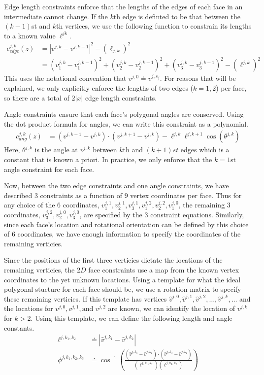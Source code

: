 Edge length constraints enforce that the lengths of the edges of each face in an intermediate cannot change. If the $k$th edge is definted to be that between the $(k-1)$st and $k$th vertices, we use the following function to constrain its lengths to a known value $\ell^{jk}$.
\begin{align}
c_{edge}^{j,k}\left(z\right)& = \left|v^{j,k} - v^{j,k-1}\right|^2 - (\ell_{j,k})^2 \\
& = \left(v_1^{j,k} - v_1^{j,k-1}\right)^2 +\left(v_2^{j,k} - v_2^{j,k-1}\right)^2 +\left(v_3^{j,k} - v_3^{j,k-1}\right)^2 - (\ell^{j,k})^2 
\end{align}  
This uses the notational convention that $v^{j,0} \doteq v^{j,s_j}$. For reasons that will be explained, we only explicitly enforce the lengths of two edges ($k=1,2$) per face, so there are a total of $2|x|$ edge length constraints. 

Angle constraints ensure that each face's polygonal angles are conserved. Using the dot product formula for angles, we can write this constraint as a polynomial.
\begin{align}
c_{ang}^{j,k}\left(z\right) &= (v^{j,k-1} - v^{j,k})\cdot(v^{j,k+1} - v^{j,k})  - \ell^{j,k}\ell^{j,k+1}\cos(\theta^{j,k})
\end{align}  
Here, $\theta^{j,k}$ is the angle at $v^{j,k}$ between $k$th and $(k+1)st$ edges which is a constant that is known a priori. In practice, we only enforce that the $k=1$st angle constraint for each face.

Now, between the two edge constraints and one angle constraints, we have described $3$ constraints as a function of $9$ vertex coordinates per face. Thus for any choice of the $6$ coordinates, $v^{j,1}_1, v^{j,1}_2, v^{j,1}_3, v^{j,2}_1, v^{j,2}_2, v^{j,0}_1$, the remaining $3$ coordinates, $v^{j,2}_3, v^{j,0}_2, v^{j,0}_3$, are specified by the $3$ constraint equations. Similarly, since each face's location and rotational orientation can be defined by this choice of $6$ coordinates, we have enough information to specify the coordinates of the remaining verticies. 

Since the positions of the first three verticies dictate the locations of the remaining verticies, the $2D$ face constraints use a map from the known vertex coordinates to the yet unknown locations. Using a template for what the ideal polygonal stucture for each face should be, we use a rotation matrix to specify these remaining verticies. If this template has vertices $\hat{v}^{j,0}, \hat{v}^{j,1}, \hat{v}^{j,2}, \dots, \hat{v}^{j,k}, \dots$ and the locations for $v^{j,0}, v^{j,1}, \text{and } v^{j,2}$ are known, we can identify the location of $v^{j,k}$ for $k>2$. Using this template, we can define the following length and angle constants.
\begin{align}
\ell^{j,k_1, k_2} &\doteq |\hat{v}^{j,k_1} - \hat{v}^{j,k_2}| \\ 
\phi^{j,k_1,k_2,k_3} &\doteq \cos^{-1}\left(\frac{\left(\hat{v}^{j,k_1} - \hat{v}^{j,k_2}\right)\cdot\left(\hat{v}^{j,k_3} - \hat{v}^{j,k_2}\right)}{(\ell^{j,k_1, k_2})(\ell^{j,k_3, k_2})}\right)   
\end{align}

